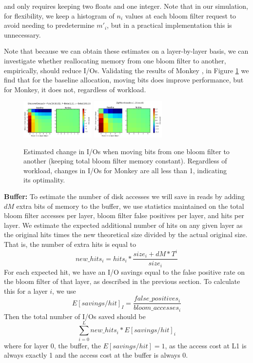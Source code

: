 \documentclass{cidr-2019}
\begin{document}
and only requires keeping two floats and one integer. Note that in our simulation, for flexibility, we keep a histogram of $n_i$ values at each bloom filter request to avoid needing to predetermine $m'_i$, but in a practical implementation this is unnecessary.

Note that because we can obtain these estimates on a layer-by-layer basis, we can investigate whether reallocating memory from one bloom filter to another, empirically, should reduce I/Os. Validating the results of Monkey \cite{monkey}, in Figure \ref{fig:bloom-realloc} we find that for the baseline allocation, moving bits does improve performance, but for Monkey, it does not, regardless of workload.

\begin{figure}[!htb]
\begin{center}
\includegraphics[width=0.33\textwidth]{bloom-moves-disc.png}
\includegraphics[width=0.33\textwidth]{bloom-moves-zipf.png}
\end{center}
\caption{Estimated change in I/Os when moving bits from one bloom filter to another (keeping total bloom filter memory constant). Regardless of workload, changes in I/Os for Monkey are all less than 1, indicating its optimality.}
\label{fig:bloom-realloc}
\end{figure}

\textbf{Buffer:} To estimate the number of disk accesses we will save in reads by adding $dM$ extra bits of memory to the buffer, we use statistics maintained on the total bloom filter accesses per layer, bloom filter false positives per layer, and hits per layer. We estimate the expected
additional number of hits on any given layer as the original hits times the new theoretical size divided by the actual original size.
That is, the number of extra hits is equal to $$new\_hits_{i} = hits_{i} * \frac{size_{i} + dM*T^{i} }{ size_{i}}$$
For each expected hit, we have an I/O savings equal to the false positive rate on the bloom filter of that layer, as described in the previous section. To calculate this for a layer $i$, we use 
$$E[savings/hit]_{I} = \frac{false\_positives_{i}}{bloom\_accesses_{i}}$$
Then the total number of I/Os saved should be 
$$
\sum_{i=0}^L new\_hits_{i} * E[savings/hit]_{i} 
$$
where for layer 0, the buffer, the $E[savings/hit] = 1$, as the access cost at L1 is always exactly 1 and the access cost at 
the buffer is always 0.
\end{document}
